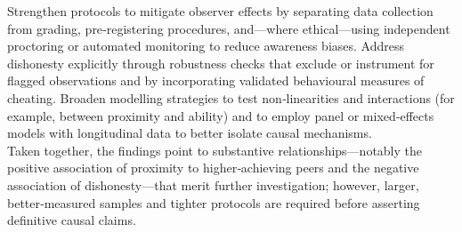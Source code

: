 \documentclass[]{article}
\begin{document}
Strengthen protocols to mitigate observer effects by separating data collection from grading, pre‑registering procedures, and—where ethical—using independent proctoring or automated monitoring to reduce awareness biases. Address dishonesty explicitly through robustness checks that exclude or instrument for flagged observations and by incorporating validated behavioural measures of cheating. Broaden modelling strategies to test non‑linearities and interactions (for example, between proximity and ability) and to employ panel or mixed‑effects models with longitudinal data to better isolate causal mechanisms.\\

Taken together, the findings point to substantive relationships—notably the positive association of proximity to higher‑achieving peers and the negative association of dishonesty—that merit further investigation; however, larger, better‑measured samples and tighter protocols are required before asserting definitive causal claims.
	
\end{document}
